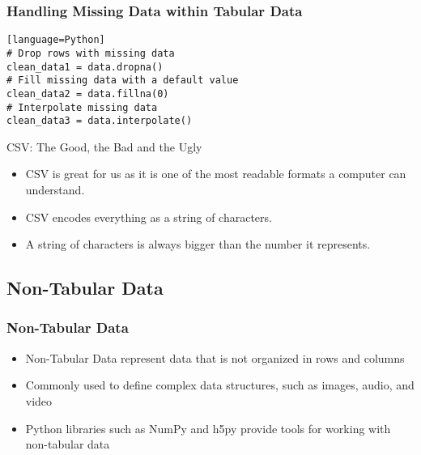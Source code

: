 \documentclass{beamer}
\begin{document}
\begin{frame}[fragile]
\frametitle{Handling Missing Data within Tabular Data}
\begin{lstlisting}[caption=Handling missing data using Pandas][language=Python]
# Drop rows with missing data
clean_data1 = data.dropna()
# Fill missing data with a default value
clean_data2 = data.fillna(0)
# Interpolate missing data
clean_data3 = data.interpolate()
\end{lstlisting}
\end{frame}


\begin{frame}{CSV: The Good, the Bad and the Ugly}
\begin{itemize}
    \item CSV is great for us as it is one of the most readable formats a computer can understand.
    \item CSV encodes everything as a string of characters.
    \item A string of characters is always bigger than the number it represents.
\end{itemize}
\end{frame}

\subsection{Non-Tabular Data}
\begin{frame}
\frametitle{Non-Tabular Data}
\begin{itemize}
\item Non-Tabular Data represent data that is not organized in rows and columns
\item Commonly used to define complex data structures, such as images, audio, and video
\item Python libraries such as NumPy and h5py provide tools for working with non-tabular data
\end{itemize}
\end{frame}
\end{document}
